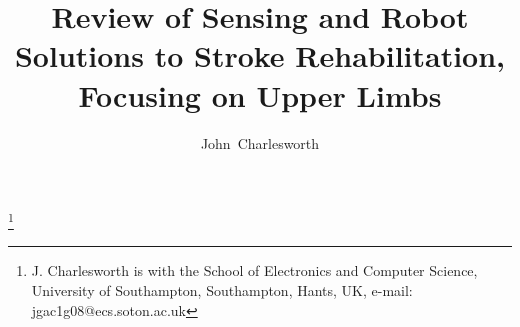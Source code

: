 \documentclass[journal]{IEEEtran}
\begin{document}
%
\title{Review of Sensing and Robot Solutions to Stroke Rehabilitation, Focusing on Upper Limbs} %
%
%
%

\author{John~Charlesworth}%
\thanks{J. Charlesworth is with the School of Electronics and Computer Science, 
University of Southampton, Southampton, Hants,
UK, e-mail: jgac1g08@ecs.soton.ac.uk}%


% 
%





% 
\end{document}
